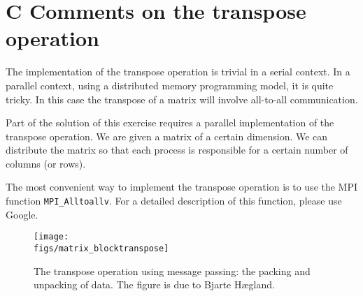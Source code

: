 \documentclass[onecolumn, oneside, a4paper, 11pt]{memoir}
\newcommand{\figs}{../figs}
\theoremstyle{remark}
\begin{document}
\section{C \quad Comments on the transpose operation}

The implementation of the transpose operation is trivial in a serial context. In
a parallel context, using a distributed memory programming model, it is quite
tricky. In this case the transpose of a matrix will involve all-to-all
communication.

Part of the solution of this exercise requires a parallel implementation of the
transpose operation. We are given a matrix of a certain dimension. We can
distribute the matrix so that each process is responsible for a certain number
of columns (or rows).

The most convenient way to implement the transpose operation is to use the MPI
function \texttt{MPI\_Alltoallv}. For a detailed description of this function,
please use Google.

\begin{figure}[htbp]
  \begin{center}
    \texttt{[image: \\figs/matrix\_blocktranspose]}
  \end{center}
  \caption{
    The transpose operation using message passing:
    the packing and unpacking of data.
    The figure is due to Bjarte H{\ae}gland.
  }
  \label{}
\end{figure}
\end{document}
